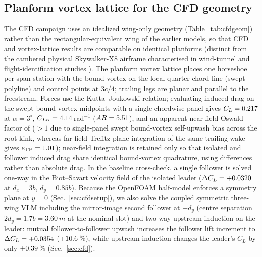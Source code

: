 \subsection{Planform vortex lattice for the CFD geometry}\label{sec:planform}
The CFD campaign uses an idealized wing-only geometry (Table~\ref{tab:cfdgeom}) rather than the rectangular-equivalent wing of the earlier models, so that CFD and vortex-lattice results are comparable on identical planforms (distinct from the cambered physical Skywalker-X8 airframe characterised in wind-tunnel and flight-identification studies \cite{gryte2018,reinhardt2022}). The planform vortex lattice places one horseshoe per span station with the bound vortex on the local quarter-chord line (swept polyline) and control points at $3c/4$; trailing legs are planar and parallel to the freestream. Forces use the Kutta--Joukowski relation; evaluating induced drag on the swept bound-vortex midpoints with a single chordwise panel gives $C_L=0.217$ at $\alpha=3^\circ$, $C_{L\alpha}=4.14$\,rad$^{-1}$ ($AR=5.51$), and an apparent near-field Oswald factor of \nplanE{} ($>1$ due to single-panel swept bound-vortex self-upwash bias across the root kink, whereas far-field Trefftz-plane integration of the same trailing wake gives $e_{\mathrm{TP}}=1.01$); near-field integration is retained only so that isolated and follower induced drag share identical bound-vortex quadrature, using differences rather than absolute drag. In the baseline cross-check, a single follower is solved one-way in the Biot--Savart velocity field of the isolated leader ($\Delta C_L=+0.0320$ at $d_x=3b$, $d_y=0.85b$). Because the OpenFOAM half-model enforces a symmetry plane at $y=0$ (Sec.~\ref{sec:cfdsetup}), we also solve the coupled symmetric three-wing VLM including the mirror-image second follower at $-d_y$ (centre separation $2d_y=1.7b=\SI{3.60}{m}$ at the nominal slot) and two-way upstream induction on the leader: mutual follower-to-follower upwash increases the follower lift increment to $\Delta C_L=+0.0354$ ($+10.6$\,\%), while upstream induction changes the leader's $C_L$ by only $+0.39$\,\% (Sec.~\ref{sec:cfd}).
